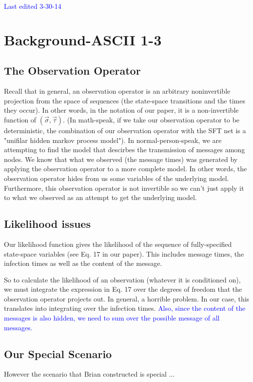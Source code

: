 \documentclass{article}
\begin{document}
\textcolor{blue}{Last edited 3-30-14}
\section{Background-ASCII 1-3}

\subsection{The Observation Operator}

	Recall that in general, an observation operator is an arbitrary
	noninvertible projection from the space of sequences (the state-space
	transitions and the times they occur). In other words, in the notation
	of our paper, it is a non-invertible function of $(\vec{\sigma},
	\vec{\tau})$. (In math-speak, if we take our observation operator to be
	deterministic, the combination of our observation operator with the
	SFT net is a "unifilar hidden markov process model").  In
	normal-person-speak, we are attempting to find the model that descirbes
	the transmission of messages among nodes.  We know that what we
	observed (the message times) was generated  by applying the observation
	operator to a more complete model.  In other words, the observation 
        operator hides from us some variables of the underlying model.  
        Furthermore, this observation operator is not invertible so we can't 
        just apply it to what we observed as an attempt to get the underlying 
        model.

\subsection{Likelihood issues}
        Our likelihood function gives the 
        likelihood of the sequence of fully-specified state-space variables 
        (see Eq. 17 in our paper). This includes message times, the infection times 
        as well as the content of the message.  

	So to calculate the likelihood of an observation (whatever it is
	conditioned on), we must integrate the expression in Eq. 17 over the
	degrees of freedom that the observation operator projects out. In
	general, a horrible problem. In our case, this translates
	into integrating over the infection times. \textcolor{blue}{Also, since 
        the content of the messages is also hidden, we need to sum over the possible
        message of all messages.}

\subsection{Our Special Scenario}	
        However the scenario that Brian constructed is special ...
\end{document}
